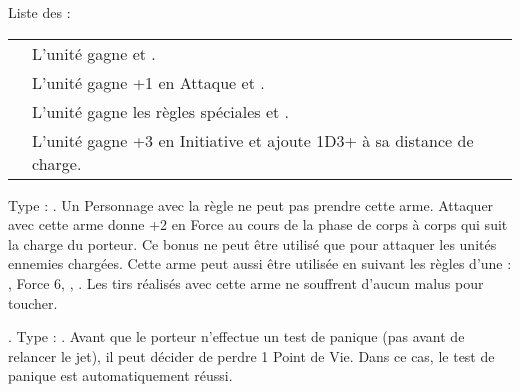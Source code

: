 
Liste des \totems :

\begin{tabular}{ll}
	\hline
	\gnarledhidetotem{} & L'unité gagne \distracting{} et \innatedefence{6}.\\
	\bloodedhorntotem{} & L'unité gagne +1 en Attaque et \armourpiercing{2}.\\
	\cloudedeyetotem{} & L'unité gagne les règles spéciales \hardtarget{} et \magicresistance{3}.\\
	\blackwingtotem{} & L'unité gagne +3 en Initiative et ajoute 1D3+\distance{1} à sa distance de charge.\\
	\hline
\end{tabular}


\closearmynewsection

\startarmymagicalitems

\armymagicalweapons

\startpricelist

Type : \hw{}. Un Personnage avec la règle \ambush{} ne peut pas prendre cette arme. Attaquer avec cette arme donne +2 en Force au cours de la phase de corps à corps qui suit la charge du porteur. Ce bonus ne peut être utilisé que pour attaquer les unités ennemies chargées. Cette arme peut aussi être utilisée en suivant les règles d'une \textbf{\boltthrower} : , Force 6, , . Les tirs réalisés avec cette arme ne souffrent d'aucun malus pour toucher.

. Type : \hw{}. Avant que le porteur n'effectue un test de panique (pas avant de relancer le jet), il peut décider de perdre 1 Point de Vie. Dans ce cas, le test de panique est automatiquement réussi.

